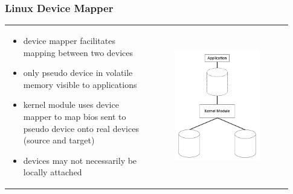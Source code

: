 \documentclass{beamer}
\begin{document}
\begin{frame}
    \frametitle{Linux Device Mapper}
    \begin{tabular}{m{0.465\linewidth}m{0.465\linewidth}}
	\begin{itemize}
	    \item device mapper facilitates mapping between two devices
	    \item only pseudo device in volatile memory visible to applications
	    \item kernel module uses device mapper to map bios sent to pseudo
		device onto real devices (source and target)
	    \item devices may not necessarily be locally attached
	\end{itemize} &
	\begin{figure}
	    \centering \includegraphics[scale=.23]{DM.png}
	    \label{fig:dm}
	\end{figure} \\
    \end{tabular}
\end{frame}
\end{document}
